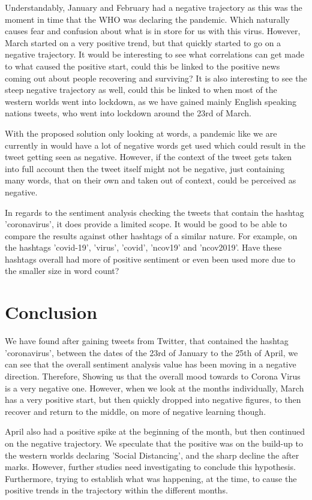 \documentclass[a4paper,10pt]{article}
\begin{document}
	Understandably, January and February had a negative trajectory as this was the moment in time that the WHO was declaring the pandemic. Which naturally causes fear and confusion about what is in store for us with this virus. However, March started on a very positive trend, but that quickly started to go on a negative trajectory. It would be interesting to see what correlations can get made to what caused the positive start, could this be linked to the positive news coming out about people recovering and surviving? It is also interesting to see the steep negative trajectory as well, could this be linked to when most of the western worlds went into lockdown, as we have gained mainly English speaking nations tweets, who went into lockdown around the 23rd of March.
	
	With the proposed solution only looking at words, a pandemic like we are currently in would have a lot of negative words get used which could result in the tweet getting seen as negative. However, if the context of the tweet gets taken into full account then the tweet itself might not be negative, just containing many words, that on their own and taken out of context, could be perceived as negative.
	
	In regards to the sentiment analysis checking the tweets that contain the hashtag 'coronavirus', it does provide a limited scope. It would be good to be able to compare the results against other hashtags of a similar nature. For example, on the hashtags 'covid-19', 'virus', 'covid', 'ncov19' and 'ncov2019'. Have these hashtags overall had more of positive sentiment or even been used more due to the smaller size in word count?
	
	\section{Conclusion}
	We have found after gaining tweets from Twitter, that contained the hashtag 'coronavirus', between the dates of the 23rd of January to the 25th of April, we can see that the overall sentiment analysis value has been moving in a negative direction. Therefore, Showing us that the overall mood towards to Corona Virus is a very negative one. However, when we look at the months individually, March has a very positive start, but then quickly dropped into negative figures, to then recover and return to the middle, on more of negative learning though.
	
	April also had a positive spike at the beginning of the month, but then continued on the negative trajectory. We speculate that the positive was on the build-up to the western worlds declaring 'Social Distancing', and the sharp decline the after marks. However, further studies need investigating to conclude this hypothesis. Furthermore, trying to establish what was happening, at the time, to cause the positive trends in the trajectory within the different months.
	
\end{document}
